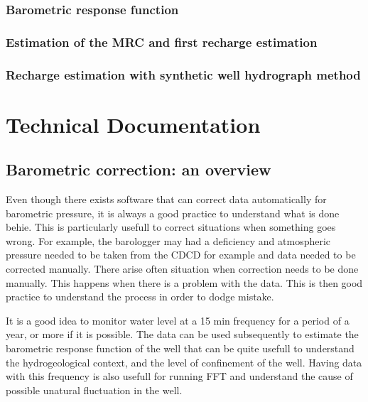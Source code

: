 \documentclass[12pt, letterpaper, fleqn]{report}
\begin{document}
\subsection{Barometric response function}
\subsection{Estimation of the MRC and first recharge estimation}
\subsection{Recharge estimation with synthetic well hydrograph method}

\chapter{Technical Documentation}

\section{Barometric correction: an overview}

\cite{freeman_use_2004}

Even though there exists software that can correct data automatically for barometric pressure, it is always a good practice to understand what is done behie. This is particularly usefull to correct situations when something goes wrong. For example, the barologger may had a deficiency and atmospheric pressure needed to be taken from the CDCD for example and data needed to be corrected manually. There arise often situation when correction needs to be done manually. This happens when there is a problem with the data. This is then good practice to understand the process in order to dodge mistake.

It is a good idea to monitor water level at a 15 min frequency for a period of a year, or more if it is possible. The data can be used subsequently to estimate the barometric response function of the well that can be quite usefull to understand the hydrogeological context, and the level of confinement of the well. Having data with this frequency is also usefull for running FFT and understand the cause of possible unatural fluctuation in the well.
\end{document}
